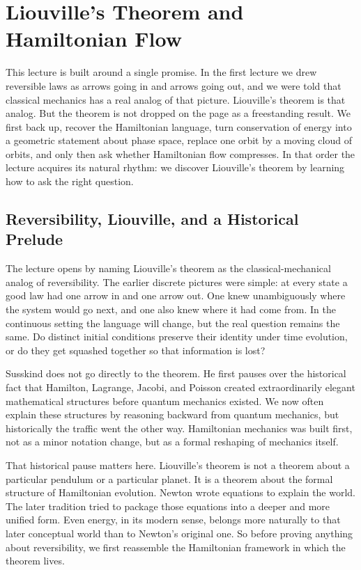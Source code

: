 \chapter{Liouville's Theorem and Hamiltonian Flow}

This lecture is built around a single promise. In the first lecture we drew reversible laws as arrows going in and arrows going out, and we were told that classical mechanics has a real analog of that picture. Liouville's theorem is that analog. But the theorem is not dropped on the page as a freestanding result. We first back up, recover the Hamiltonian language, turn conservation of energy into a geometric statement about phase space, replace one orbit by a moving cloud of orbits, and only then ask whether Hamiltonian flow compresses. In that order the lecture acquires its natural rhythm: we discover Liouville's theorem by learning how to ask the right question.

\section{Reversibility, Liouville, and a Historical Prelude}

The lecture opens by naming Liouville's theorem as the classical-mechanical analog of reversibility. The earlier discrete pictures were simple: at every state a good law had one arrow in and one arrow out. One knew unambiguously where the system would go next, and one also knew where it had come from. In the continuous setting the language will change, but the real question remains the same. Do distinct initial conditions preserve their identity under time evolution, or do they get squashed together so that information is lost?

Susskind does not go directly to the theorem. He first pauses over the historical fact that Hamilton, Lagrange, Jacobi, and Poisson created extraordinarily elegant mathematical structures before quantum mechanics existed. We now often explain these structures by reasoning backward from quantum mechanics, but historically the traffic went the other way. Hamiltonian mechanics was built first, not as a minor notation change, but as a formal reshaping of mechanics itself.

That historical pause matters here. Liouville's theorem is not a theorem about a particular pendulum or a particular planet. It is a theorem about the formal structure of Hamiltonian evolution. Newton wrote equations to explain the world. The later tradition tried to package those equations into a deeper and more unified form. Even energy, in its modern sense, belongs more naturally to that later conceptual world than to Newton's original one. So before proving anything about reversibility, we first reassemble the Hamiltonian framework in which the theorem lives.

